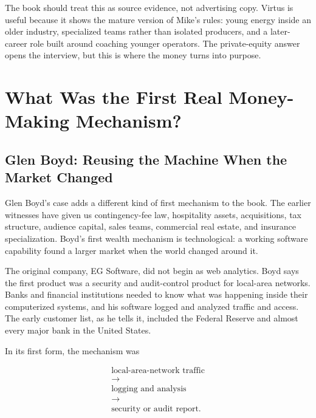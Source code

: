 \documentclass[11pt,oneside]{book}
\begin{document}
The book should treat this as source evidence, not advertising copy. Virtus is useful because it shows the mature version of Mike's rules: young energy inside an older industry, specialized teams rather than isolated producers, and a later-career role built around coaching younger operators. The private-equity answer opens the interview, but this is where the money turns into purpose.


\chapter{What Was the First Real Money-Making Mechanism?}

\section{Glen Boyd: Reusing the Machine When the Market Changed}

Glen Boyd's case adds a different kind of first mechanism to the book. The earlier witnesses have given us contingency-fee law, hospitality assets, acquisitions, tax structure, audience capital, sales teams, commercial real estate, and insurance specialization. Boyd's first wealth mechanism is technological: a working software capability found a larger market when the world changed around it.

The original company, EG Software, did not begin as web analytics. Boyd says the first product was a security and audit-control product for local-area networks. Banks and financial institutions needed to know what was happening inside their computerized systems, and his software logged and analyzed traffic and access. The early customer list, as he tells it, included the Federal Reserve and almost every major bank in the United States.

In its first form, the mechanism was

\begin{equation}
\begin{gathered}
\text{local-area-network traffic}\\
\longrightarrow\\
\text{logging and analysis}\\
\longrightarrow\\
\text{security or audit report}.
\end{gathered}
\end{equation}
\end{document}
